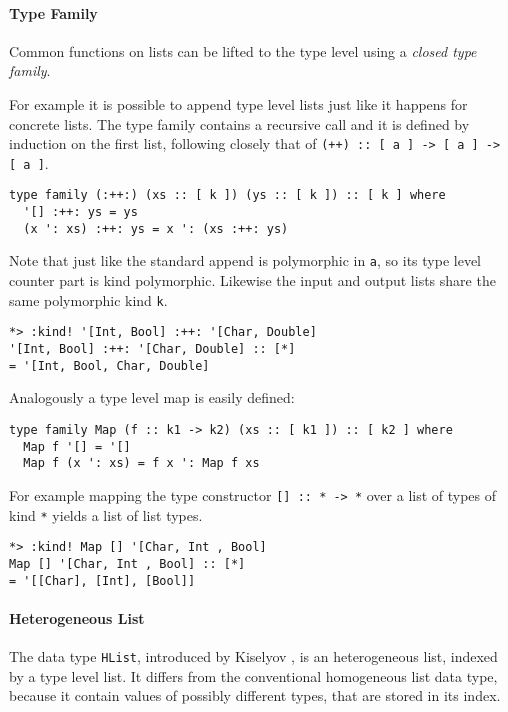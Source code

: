 \documentclass[../Thesis.tex]{subfiles}
\begin{document}
	\paragraph{Type Family}
	Common functions on lists can be lifted to the type level
	using a \emph{closed type family}.

	For example it is possible to append type level lists just like
	it happens for concrete lists.
	The type family contains a recursive call and it is defined
	by induction on the first list, following closely that
	of \texttt{(++) :: [ a ] -> [ a ] -> [ a ]}.
\begin{verbatim}	
type family (:++:) (xs :: [ k ]) (ys :: [ k ]) :: [ k ] where
  '[] :++: ys = ys
  (x ': xs) :++: ys = x ': (xs :++: ys)
\end{verbatim}

	Note that just like the standard append is polymorphic in \texttt{a}, so its 
	type level counter part is	kind polymorphic. 
	Likewise the input and output lists share the same polymorphic kind 
	\texttt{k}.
	
\begin{verbatim}
*> :kind! '[Int, Bool] :++: '[Char, Double]
'[Int, Bool] :++: '[Char, Double] :: [*]
= '[Int, Bool, Char, Double]
\end{verbatim}
	
	Analogously a type level map is easily defined:
\begin{verbatim}
type family Map (f :: k1 -> k2) (xs :: [ k1 ]) :: [ k2 ] where
  Map f '[] = '[] 
  Map f (x ': xs) = f x ': Map f xs
\end{verbatim}
	
	For example mapping the type constructor \texttt{[] :: * -> *} over a list
	of types of kind \texttt{*} yields a list of list types.
		
\begin{verbatim}
*> :kind! Map [] '[Char, Int , Bool]
Map [] '[Char, Int , Bool] :: [*]
= '[[Char], [Int], [Bool]]
\end{verbatim}

	\paragraph{Heterogeneous List}
	\label{par:HLIst}
	The data type \texttt{HList}, introduced by Kiselyov 
	\cite{Kiselyov04stronglytyped}, is an heterogeneous list, 
	indexed by a type level list. 
	It differs from the conventional homogeneous list data type, because it 
	contain values of possibly different types, that are
	stored in its index.
\end{document}
